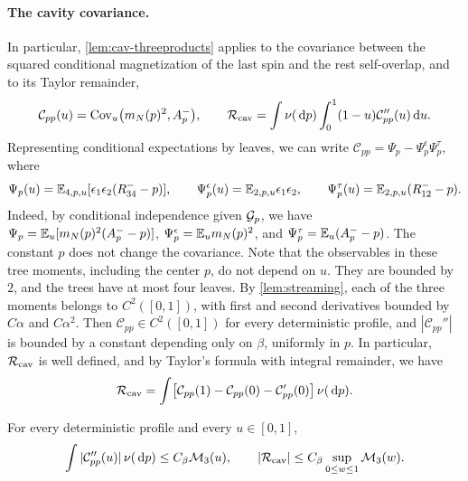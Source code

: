\paragraph{The cavity covariance.}
In particular, \cref{lem:cav-threeproducts} applies to the covariance
between the squared conditional magnetization of the last spin and the
rest self-overlap, and to its Taylor remainder,
\[
 \mathcal C_{pp}(u)=\operatorname{Cov}_u\bigl(m_N(p)^2,A_p^-\bigr),\qquad
 \mathcal R_{\rm cav}=\int\nu(\,\mathrm d p)\int_0^1(1-u)
                              \mathcal C_{pp}''(u)\,\mathrm d u .
\]
Representing conditional expectations by leaves, we can write
$\mathcal C_{pp}=\Psi_p-\Psi^\epsilon_p\Psi^\tau_p$, where
\[
 \Psi_p(u)=\mathbb E_{4,p,u}[\epsilon_1\epsilon_2(R^-_{34}-p)],\qquad
 \Psi^\epsilon_p(u)=\mathbb E_{2,p,u}\epsilon_1\epsilon_2,\qquad
 \Psi^\tau_p(u)=\mathbb E_{2,p,u}(R^-_{12}-p).
\]
Indeed, by conditional independence given $\mathcal G_p$, we have
$\Psi_p=\mathbb E_u[m_N(p)^2(A_p^--p)]$, $\Psi^\epsilon_p=\mathbb E_um_N(p)^2$, and
$\Psi^\tau_p=\mathbb E_u(A_p^--p)$. The constant $p$ does not change the
covariance. Note that the observables in these tree moments, including the center
$p$, do not depend on $u$. They are bounded by $2$, and the
trees have at most four leaves. By \cref{lem:streaming}, each of the
three moments belongs to $C^2([0,1])$, with first and second
derivatives bounded by $C\alpha$ and $C\alpha^2$. Then
$\mathcal C_{pp}\in C^2([0,1])$ for every deterministic profile, and
$|\mathcal C_{pp}''|$ is bounded by a constant depending only on
$\beta$, uniformly in $p$. In particular, $\mathcal R_{\rm cav}$ is well
defined, and by Taylor's formula with integral remainder, we have
\[
 \mathcal R_{\rm cav}=\int\bigl[\mathcal C_{pp}(1)-\mathcal C_{pp}(0)
   -\mathcal C_{pp}'(0)\bigr]\,\nu(\,\mathrm d p).
\]

\begin{lemma}\label{lem:remainder}
For every deterministic profile and every $u\in[0,1]$,
\begin{equation}\label{eq:C2derivative}
 \int|\mathcal C_{pp}''(u)|\,\nu(\,\mathrm d p)\le C_\beta\mathcal M_3(u),
 \qquad
 |\mathcal R_{\rm cav}|\le C_\beta\sup_{0\le w\le1}\mathcal M_3(w).
\end{equation}
\end{lemma}

